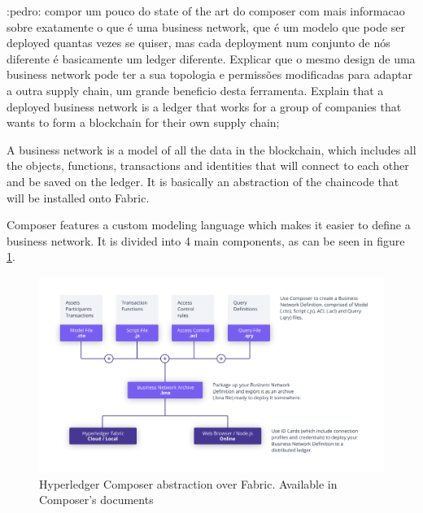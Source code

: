 \todo:{pedro: compor um pouco do state of the art do composer com mais informacao sobre exatamente o que é uma business network, que é um modelo que pode ser deployed quantas vezes se quiser, mas cada deployment num conjunto de nós diferente é basicamente um ledger diferente. Explicar que o mesmo design de uma business network pode ter a sua topologia e permissões modificadas para adaptar a outra supply chain, um grande beneficio desta ferramenta. Explain that a deployed business network is a ledger that works for a group of companies that wants to form a blockchain for their own supply chain; }


A business network is a model of all the data in the blockchain, which includes all the objects, functions, transactions and identities that will connect to each other and be saved on the ledger. It is basically an abstraction of the chaincode that will be installed onto Fabric.

Composer features a custom modeling language which makes it easier to define a business network. It is divided into 4 main components, as can be seen in figure \ref{fig:composer_abstraction}.

\begin{figure}[h]
\centering
\includegraphics[scale=0.40]{media/Composer-Diagram.png}
\caption[Hyperledger Composer abstraction over Fabric]{Hyperledger Composer abstraction over Fabric. Available in Composer's documents \cite{ComposerIntro}}
\label{fig:composer_abstraction}
\end{figure}

